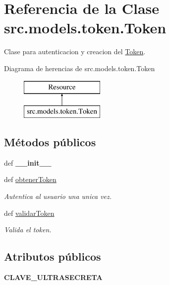 \hypertarget{classsrc_1_1models_1_1token_1_1_token}{\section{Referencia de la Clase src.\-models.\-token.\-Token}
\label{classsrc_1_1models_1_1token_1_1_token}
}


Clase para autenticacion y creacion del \hyperlink{classsrc_1_1models_1_1token_1_1_token}{Token}.  


Diagrama de herencias de src.\-models.\-token.\-Token\begin{figure}[H]
\begin{center}
\leavevmode
\includegraphics[height=2.000000cm]{classsrc_1_1models_1_1token_1_1_token}
\end{center}
\end{figure}
\subsection*{Métodos públicos}
\begin{DoxyCompactItemize}
\item 
\hypertarget{classsrc_1_1models_1_1token_1_1_token_a673568b00450f5644e8408eff2388cbe}{def {\bfseries \-\_\-\-\_\-init\-\_\-\-\_\-}}\label{classsrc_1_1models_1_1token_1_1_token_a673568b00450f5644e8408eff2388cbe}

\item 
def \hyperlink{classsrc_1_1models_1_1token_1_1_token_a6efab07d00f27b0a50478b27ba1fa920}{obtener\-Token}
\begin{DoxyCompactList}\small\item\em Autentica al usuario una unica vez. \end{DoxyCompactList}\item 
def \hyperlink{classsrc_1_1models_1_1token_1_1_token_aa38dc82b2a162d45ce1f4d492e8bf99c}{validar\-Token}
\begin{DoxyCompactList}\small\item\em Valida el token. \end{DoxyCompactList}\end{DoxyCompactItemize}
\subsection*{Atributos públicos}
\begin{DoxyCompactItemize}
\item 
\hypertarget{classsrc_1_1models_1_1token_1_1_token_af98d64a3e07c1a7104e801cf9ad40172}{{\bfseries C\-L\-A\-V\-E\-\_\-\-U\-L\-T\-R\-A\-S\-E\-C\-R\-E\-T\-A}}\label{classsrc_1_1models_1_1token_1_1_token_af98d64a3e07c1a7104e801cf9ad40172}

\end{DoxyCompactItemize}
